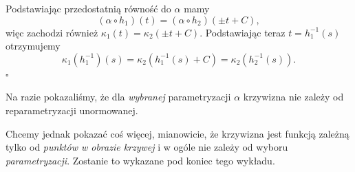 \begin{frame}[<+->]


Podstawiając przedostatnią równość do $\alpha$ mamy 
\[(\alpha\circ h_1)(t)=(\alpha\circ h_2)(\pm t+C),\]
\pause więc zachodzi również $\kappa_1(t)=\kappa_2(\pm t+C)$. \pause Podstawiając teraz $t=h_1^{-1}(s)$ otrzymujemy 
\[\kappa_1(h_1^{-1})(s)=\kappa_2(h_1^{-1}(s)+C)=\kappa_2(h_2^{-1}(s)\!).\]
\hfill $\square$

\end{frame}

\begin{uwaga}
Na razie pokazaliśmy, że dla \textit{wybranej} parametryzacji $\alpha$ krzywizna 
nie zależy od reparametryzacji unormowanej.

Chcemy jednak pokazać coś więcej, mianowicie, że krzywizna jest funkcją zależną tylko od \textit{punktów w obrazie krzywej} i w ogóle nie zależy od wyboru \textit{parametryzacji}. Zostanie to wykazane pod koniec tego wykładu.
\end{uwaga}



